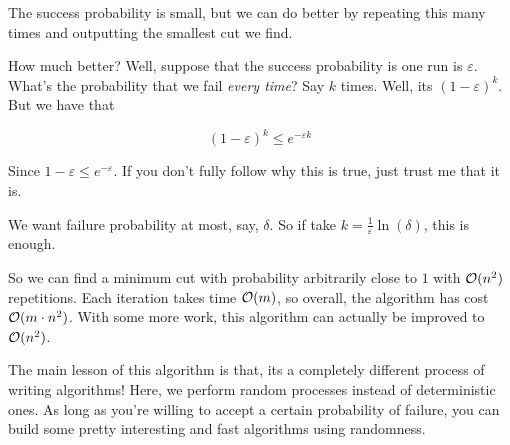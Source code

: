 \documentclass[12pt]{article}
\def\eps{\varepsilon}
\begin{document}
  The success probability is small, but we can do better by repeating this many
  times and outputting the smallest cut we find.

  How much better? Well, suppose that the success probability is one run is
  $\eps$. What's the probability that we fail {\it every time}? Say $k$ times.
  Well, its $(1 - \eps)^k$. But we have that

  \[
    (1 - \eps)^k \le e^{-\eps k}
  \]

  Since $1 - \eps \le e^{-\eps}$. If you don't fully follow why this is true,
  just trust me that it is.

  We want failure probability at most, say, $\delta$. So if take $k =
  \frac{1}{\eps} \ln(\delta)$, this is enough.

  So we can find a minimum cut with probability arbitrarily close to $1$ with
  $\mathcal O(n^2)$ repetitions. Each iteration takes time $\mathcal O(m)$, so overall, the
  algorithm has cost $\mathcal O(m \cdot n^2)$. With some more work, this algorithm can
  actually be improved to $\mathcal O(n^2)$.

  The main lesson of this algorithm is that, its a completely different process
  of writing algorithms! Here, we perform random processes instead of
  deterministic ones. As long as you're willing to accept a certain probability
  of failure, you can build some pretty interesting and fast algorithms using
  randomness.
\end{document}
